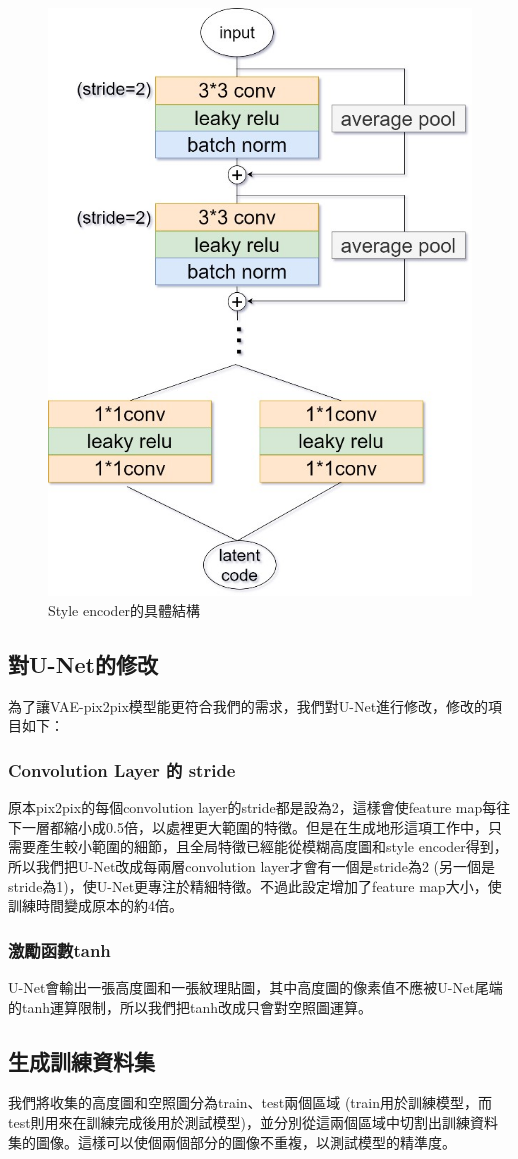 \documentclass[a4paper, 12pt]{article}
\begin{document}
\begin{figure}[htbp]
    \centering
    \includegraphics[width=0.4\linewidth]{fig/8.jpg}
    \caption{Style encoder的具體結構}
    \label{fig:7}
\end{figure}

\subsection{對U-Net的修改}
為了讓VAE-pix2pix模型能更符合我們的需求，我們對U-Net進行修改，修改的項目如下：

\subsubsection{Convolution Layer 的 stride}
原本pix2pix的每個convolution layer的stride都是設為2，這樣會使feature map每往下一層都縮小成0.5倍，以處裡更大範圍的特徵。但是在生成地形這項工作中，只需要產生較小範圍的細節，且全局特徵已經能從模糊高度圖和style encoder得到，所以我們把U-Net改成每兩層convolution layer才會有一個是stride為2 (另一個是stride為1)，使U-Net更專注於精細特徵。不過此設定增加了feature map大小，使訓練時間變成原本的約4倍。

\subsubsection{激勵函數tanh}

U-Net會輸出一張高度圖和一張紋理貼圖，其中高度圖的像素值不應被U-Net尾端的tanh運算限制，所以我們把tanh改成只會對空照圖運算。

\subsection{生成訓練資料集}

我們將收集的高度圖和空照圖分為train、test兩個區域 (train用於訓練模型，而test則用來在訓練完成後用於測試模型)，並分別從這兩個區域中切割出訓練資料集的圖像。這樣可以使個兩個部分的圖像不重複，以測試模型的精準度。
\end{document}
